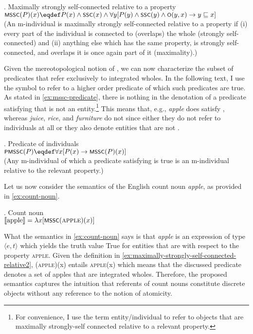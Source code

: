 	\ex. Maximally strongly self-connected relative to a property\label{ex:maximally-strongly-self-connected-relative2}\\
	$\cnst{mssc}(P)(x) \eqdef P(x) \wedge \cnst{ssc}(x) \wedge \forall y[P(y) \wedge \cnst{ssc}(y) \wedge \cnst{o}(y,x) \rightarrow y \sqsubseteq x]$\\
	(An m-individual is maximally strongly self-connected relative to a property if (i) every part of the individual is connected to (overlaps) the whole (strongly self-connected) and (ii) anything else which has the same property, is strongly self-connected, and overlaps it is once again part of it (maximality).)
	
	Given the mereotopological notion of , we can now characterize the subset of predicates that refer exclusively to integrated wholes. In the following text, I use the symbol  to refer to a higher order predicate of which such predicates are true. As stated in \ref{ex:mssc-predicate}, there is nothing in the denotation of a predicate satisfying  that is not an  entity.\footnote{For convenience, I use the term  entity/individual to refer to objects that are maximally strongly-self connected relative to a relevant property.} This means that, e.g., \textit{apple} does satisfy , whereas \textit{juice}, \textit{rice}, and \textit{furniture} do not since either they do not refer to  individuals at all or they also denote entities that are not .

    \ex. Predicate of  individuals\\
	$\cnst{pmssc}(P) \eqdef \forall x[P(x) \rightarrow \cnst{mssc}(P)(x)]$\\
	(Any m-individual of which a predicate satisfying  is true is an  m-individual relative to the relevant property.)\label{ex:mssc-predicate}
	
	Let us now consider the semantics of the English count noun \textit{apple}, as provided in \ref{ex:count-noun}.
	
	\ex. Count noun\\
	$\llbracket \text{apple}\rrbracket = \lambda x[\cnst{mssc}(\textsc{apple})(x)]$\label{ex:count-noun}
	
	What the semantics in \ref{ex:count-noun} says is that \textit{apple} is an expression of type $\langle e,t\rangle$ which yields the truth value True for entities that are  with respect to the property \textsc{apple}. Given the definition in \ref{ex:maximally-strongly-self-connected-relative2}, (\textsc{apple})(x) entails \textsc{apple}(x) which means that the discussed predicate denotes a set of apples that are integrated wholes. Therefore, the proposed semantics captures the intuition that referents of count nouns constitute discrete objects without any reference to the notion of atomicity.
	
